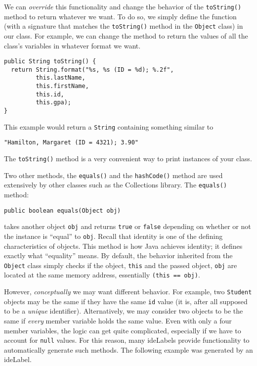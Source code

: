 We can \emph{override} this functionality and change the behavior
of the \texttt{toString()} method to return whatever we want.
To do so, we simply define the function (with a signature that matches
the \texttt{toString()} method in the \texttt{Object}
class) in our class.  For example, we can change the method to
return the values of all the class's variables in whatever format we 
want.

\begin{verbatim}
public String toString() {
  return String.format("%s, %s (ID = %d); %.2f", 
         this.lastName,
         this.firstName,
         this.id,
         this.gpa);
}
\end{verbatim}

This example would return a \texttt{String} containing 
something similar to

\texttt{"Hamilton, Margaret (ID = 4321); 3.90"}

The \texttt{toString()} method is a very convenient way to
print instances of your class.  

Two other methods, the \texttt{equals()} and the
\texttt{hashCode()} method are used extensively by
other classes such as the Collections library.  The 
\texttt{equals()} method:

\texttt{public boolean equals(Object obj)}

takes another object \texttt{obj} and returns 
\texttt{true} or \texttt{false} depending on 
whether or not the instance is ``equal'' to \texttt{obj}.
Recall that identity is one of the defining characteristics of
objects.  This method is how Java achieves identity; it defines
exactly what ``equality'' means.  By default, the behavior
inherited from the \texttt{Object} class simply checks
if the object, \texttt{this} and the passed object, 
\texttt{obj} are located at the same memory address, 
essentially \texttt{(this == obj)}.  

However, \emph{conceptually} we may want different behavior.
For example, two \texttt{Student} objects may be the
same if they have the same \texttt{id} value (it is, 
after all supposed to be a \emph{unique} identifier).  Alternatively, 
we may consider two objects to be the same if \emph{every} 
member variable holds the same value.  Even with only a four
member variables, the logic can get quite complicated, especially
if we have to account for \texttt{null} values.
For this reason, many \glspl{ideLabel} provide functionality to
automatically generate such methods.  The following example was
generated by an \gls{ideLabel}.

